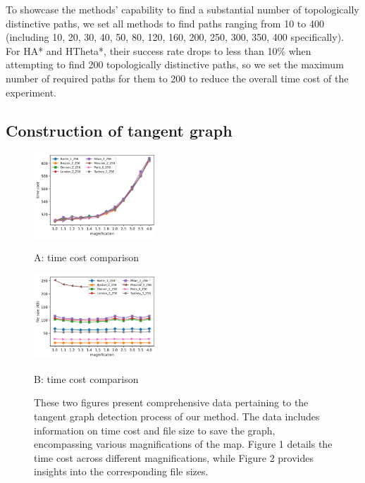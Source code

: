 \documentclass[lettersize,journal]{IEEEtran}
\begin{document}
To showcase the methods' capability to find a substantial number of topologically distinctive paths, we set all methods to find paths ranging from 10 to 400 (including 10, 20, 30, 40, 50, 80, 120, 160, 200, 250, 300, 350, 400 specifically). For HA* and HTheta*, their success rate drops to less than 10\% when attempting to find 200 topologically distinctive paths, so we set the maximum number of required paths for them to 200 to reduce the overall time cost of the experiment.


\subsection{Construction of tangent graph}

\begin{figure}[t] \scriptsize
\begin{minipage}{.48\linewidth}
  \centerline{\includegraphics[width=4.6cm]{pre_time_cost.png}}
  \centerline{A: time cost comparison}
\end{minipage}
\hfill
\begin{minipage}{.48\linewidth}
  \centerline{\includegraphics[width=4.6cm]{pre_file_size.png}}
  \centerline{B: time cost comparison}
\end{minipage}
\vfill

\caption{These two figures present comprehensive data pertaining to the tangent graph detection process of our method. The data includes information on time cost and file size to save the graph, encompassing various magnifications of the map. Figure 1 details the time cost across different magnifications, while Figure 2 provides insights into the corresponding file sizes.}
\label{precomputation_data}
\end{figure}
\end{document}
